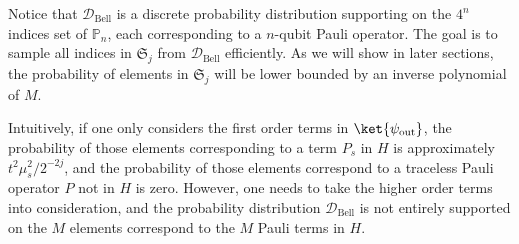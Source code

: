 \documentclass[twocolumn,superscriptaddress,aps,showpacs,amsmath,amstex,amssymb,citeautoscript,floatfix,pra,preprintnumbers]{revtex4-2}
\theoremstyle{plain}
\theoremstyle{plain}
\theoremstyle{plain}
\theoremstyle{plain}
\theoremstyle{plain}
\theoremstyle{plain}
\begin{document}
\begin{appendix}
Notice that $\mathcal{D}_{\text{Bell}}$ is a discrete probability distribution supporting on the $4^n$ indices set of $\mathbb{P}_n$, each corresponding to a $n$-qubit Pauli operator. The goal is to sample all indices in $\mathfrak{S}_j$ from $\mathcal{D}_{\text{Bell}}$ efficiently. As we will show in later sections, the probability of elements in $\mathfrak{S}_j$ will be lower bounded by an inverse polynomial of $M$.



Intuitively, if one only considers the first order terms in $\ket{\psi_{\text{out}}}$, the probability of those elements corresponding to a term $P_s$ in $H$ is approximately $t^2\mu_s^2/2^{-2j}$, and the probability of those elements correspond to a traceless Pauli operator $P$ not in $H$ is zero. However, one needs to take the higher order terms into consideration, and the probability distribution $\mathcal{D}_{\text{Bell}}$ is not entirely supported on the $M$ elements correspond to the $M$ Pauli terms in $H$.



\end{appendix}
\end{document}
